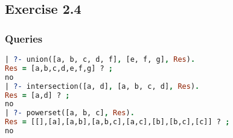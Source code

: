 \pagebreak

\subsection{Exercise 2.4}

\subsubsection{Queries}
\begin{lstlisting}[language=Prolog]
| ?- union([a, b, c, d, f], [e, f, g], Res).
Res = [a,b,c,d,e,f,g] ? ;
no
| ?- intersection([a, d], [a, b, c, d], Res).
Res = [a,d] ? ;
no
| ?- powerset([a, b, c], Res).
Res = [[],[a],[a,b],[a,b,c],[a,c],[b],[b,c],[c]] ? ;
no
\end{lstlisting}